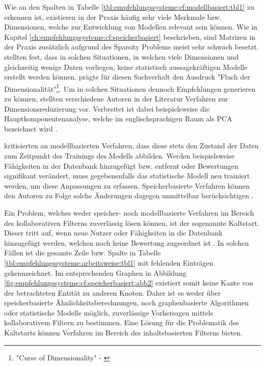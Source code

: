 Wie an den Spalten in Tabelle \ref{tbl:empfehlungssysteme:cf:modellbasiert:tbl1} zu erkennen ist, existieren in der Praxis häufig sehr viele Merkmale bzw. Dimensionen, welche zur Entwicklung von Modellen relevant sein können. Wie in Kapitel \ref{ch:empfehlungssysteme:cf:speicherbasiert} beschrieben, sind Matrizen in der Praxis zusätzlich aufgrund des Sparsity Problems meist sehr schwach besetzt. \textcite[S. 1]{boratto:2014} stellten fest, dass in solchen Situationen, in welchen viele Dimensionen und gleichzeitig wenige Daten vorliegen, keine statistisch aussagekräftigen Modelle erstellt werden können. \textcite[S. 94, Z. 7]{bellman:1961} prägte für diesen Sachverhalt den Ausdruck "Fluch der Dimensionalität"\footnote{"Curse of Dimensionality" - \textcite[S. 94, Z. 7]{bellman:1961}}. Um in solchen Situationen dennoch Empfehlungen generieren zu können, stellten verschiedene Autoren in der Literatur Verfahren zur Dimensionsreduzierung vor. Verbreitet ist dabei beispielsweise die Hauptkomponentenanalyse, welche im englischsprachigen Raum als \ac{PCA} bezeichnet wird \cite[S. 1ff.]{vaswani:2018}.

\textcite[S. 1f.]{pennock:2000} kritisierten an modellbasierten Verfahren, dass diese stets den Zustand der Daten zum Zeitpunkt des Trainings des Modells abbilden. Werden beispielsweise Fähigkeiten in der Datenbank hinzugefügt bzw. entfernt oder Bewertungen signifikant verändert, muss gegebenenfalls das statistische Modell neu trainiert werden, um diese Anpassungen zu erfassen. Speicherbasierte Verfahren können den Autoren zu Folge solche Änderungen dagegen unmittelbar berücksichtigen \cite[S. 1f.]{pennock:2000}.

Ein Problem, welches weder speicher- noch modellbasierte Verfahren im Bereich des kollaborativen Filterns zuverlässig lösen können, ist der sogenannte Kaltstart. Dieser tritt auf, wenn neue Nutzer oder Fähigkeiten in die Datenbank hinzugefügt werden, welchen noch keine Bewertung zugeordnet ist \cite[S. 5]{huang:2004}. In solchen Fällen ist die gesamte Zeile bzw. Spalte in Tabelle \ref{tbl:empfehlungssysteme:arbeitsweise:tbl1} mit fehlenden Einträgen gekennzeichnet. Im entsprechenden Graphen in Abbildung \ref{fig:empfehlungssysteme:cf:speicherbasiert:abb2} existiert somit keine Kante von der betrachteten Entität zu anderen Knoten. Daher ist es weder über speicherbasierte Ähnlichkeitsberechnungen, noch graphenbasierte Algorithmen oder statistische Modelle möglich, zuverlässige Vorhersagen mittels kollaborativem Filtern zu bestimmen. Eine Lösung für die Problematik des Kaltstarts können Verfahren im Bereich des inhaltsbasierten Filterns bieten. %

